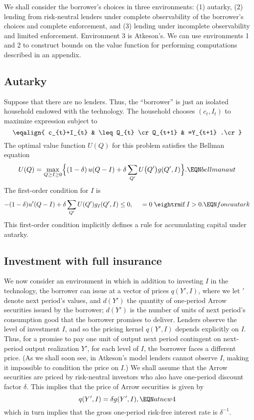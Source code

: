 We shall consider the borrower's choices in three environments: (1)
autarky, (2) lending from risk-neutral lenders under complete observability
of the borrower's choices and complete enforcement,  and (3) lending
under incomplete observability and  limited enforcement. Environment
3 is Atkeson's.
 We  can use environments 1 and 2 to construct
bounds on the value function for performing computations described
in an appendix.

\subsection{Autarky}

Suppose that there are no lenders.  Thus, the ``borrower'' is
just an isolated household endowed with the technology. The
household chooses $(c_{t},I_{t})$ to maximize expression
 subject to
$$\eqalign{ c_{t}+I_{t} & \leq Q_{t}  \cr
 Q_{t+1} & =Y_{t+1} .\cr} $$
The optimal  value function $U(Q)$  for this problem  satisfies
the Bellman equation
$$U(Q)=\max_{Q\geq I \geq 0}\Bigl\{ (1-\delta)\,
u(Q-I)+\delta \sum_{Q'} U\bigl(Q^{\prime}\bigr)g(Q^{\prime},I)
    \Bigr\}.
 \EQN bellmanaut $$
The first-order condition for $I$ is
$$ -(1-\delta) u'(Q-I) + \delta \sum_{Q'} U(Q') g_I(Q',I)
                                      \leq 0, \hskip.5cm = 0 \;\hbox{\rm if}\; I>0.
   \EQN foncautark $$
This first-order condition implicitly defines a rule for
accumulating capital under autarky.

\subsection{Investment with full insurance}
We now consider an environment in which in addition
to investing $I$ in the technology, the borrower
can issue  at a vector of prices $q(Y',I)$, where
we let $'$ denote next period's values, and $d(Y')$ the
quantity of one-period  Arrow securities issued by the borrower;
$d(Y')$ is the number of units of next period's consumption
good that the borrower promises to deliver.
Lenders observe the level of investment $I$, and so the pricing kernel
$q(Y',I)$ depends explicitly on $I$.  Thus, for  a promise to pay
one unit of output next period contingent on
next-period output realization
$Y'$, for each level of $I$, the borrower faces a different price.
(As we shall soon see,
in Atkeson's model  lenders cannot observe $I$, making it impossible
to condition the price on $I$.)
We shall assume that the Arrow securities are priced by
 risk-neutral investors who also have
one-period discount factor $\delta$.
This implies that the price
of Arrow securities is given by
$$ q(Y',I) = \delta g(Y', I),  \EQN atnew4 $$
which in turn implies that the
gross one-period risk-free interest rate is $\delta^{-1}$.

